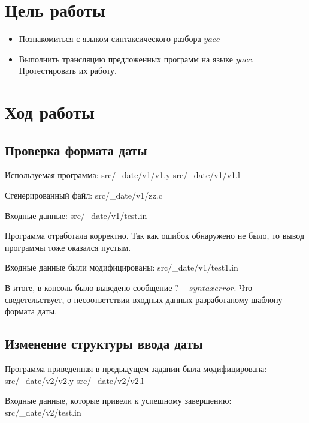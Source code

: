 





\section{Цель работы}
\begin{itemize}
\item Познакомиться с языком синтаксического разбора $yacc$
\item Выполнить трансляцию предложенных программ на языке $yacc$. Протестировать их работу.
\end{itemize}


\section{Ход работы}

\subsection{Проверка формата даты}

    Используемая программа:
     {src/_date/v1/v1.y}
     {src/_date/v1/v1.l}

    Сгенерированный файл:
     {src/_date/v1/zz.c}

    Входные данные:
     {src/_date/v1/test.in}

    Программа отработала корректно. 
    Так как ошибок обнаружено не было,
    то вывод программы тоже оказался пустым.

    Входные данные были модифицированы:
     {src/_date/v1/test1.in}

    В итоге, в консоль было выведено сообщение $?-syntax error$.
    Что сведетельствует, о несоответствии входных данных
    разработаному шаблону формата даты.

\subsection{Изменение структуры ввода даты}

    Программа приведенная в предыдущем задании была модифицирована:
     {src/_date/v2/v2.y}
     {src/_date/v2/v2.l}

    Входные данные, которые привели к успешному завершению:
     {src/_date/v2/test.in}

